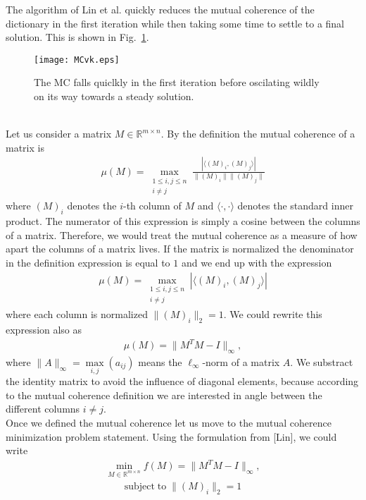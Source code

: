 \documentclass[journal]{IEEEtran}
\begin{document}
The algorithm of Lin et al. quickly reduces the mutual coherence of the dictionary in the first iteration while then taking some time to settle to a final solution. This is shown in Fig.~\ref{Fig:mcvk}.
\begin{figure}[!t]
\centering
\texttt{[image: MCvk.eps]}
\caption{The MC falls quiclkly in the first iteration before oscilating wildly on its way towards a
steady solution.}
\label{Fig:mcvk}
\end{figure}
\bigskip \\
Let us consider a matrix $ M\in \mathbb{ R}^{m\times n}$. By the definition the mutual coherence of a matrix is
\begin{align}
\mu(M)=\max\limits_{\substack{1\leq i,j \leq n \\ i\neq j}}\frac{|\langle (M)_i, (M)_j \rangle |}{\|(M)_i\| \|(M)_j\|}
\end{align}
where $ (M)_i$ denotes the $i$-th column of $M$ and $\langle\cdot , \cdot \rangle $ denotes the standard inner product. The numerator of this expression is simply a cosine between the columns of a matrix. Therefore, we would treat the mutual coherence as a measure of how apart the columns of a matrix lives.  If the matrix is normalized the denominator in the definition expression is equal to $1$ and we end up with  the expression
\begin{align}
\mu(M)=\max\limits_{\substack{1\leq i,j \leq n \\ i\neq j}}|\langle (M)_i, (M)_j \rangle |
\end{align}
where each column is normalized $ \|(M)_i\|_2=1$.  We could rewrite this expression also as
\begin{align}
\mu(M)=\|M^TM-I\|_{\infty},
\end{align}
where $\|A \|_{\infty}=\max\limits_{i,j}(a_{ij})$ means the $\ell_{\infty}$-norm of a matrix $A$. We substract the identity matrix to avoid the influence of diagonal elements, because according to the mutual coherence definition we are interested in angle between the different columns $i\neq j$. \\
Once we defined the mutual coherence let us move to the mutual coherence minimization problem statement.  Using the formulation from [Lin], we could write
\begin{align}
\min_{M\in\mathbb{R}^{m\times n}}f(M)=\|M^TM-I\|_{\infty},
\end{align}
\begin{align}
\textrm{subject}\;\textrm{to} \;\|(M)_i\|_2=1
\end{align}
\end{document}
